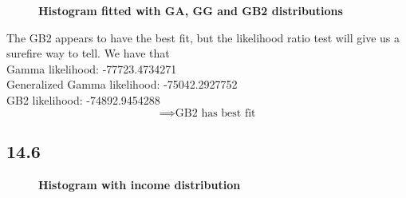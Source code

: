 \documentclass[letterpaper,12pt]{article}
\theoremstyle{definition}
\begin{document}
\begin{figure}[htb]\centering \captionsetup{width=4.0in}
        \caption{\label{Histogram<800}\textbf{Histogram fitted with GA, GG and GB2 distributions}}
\end{figure}

The GB2 appears to have the best fit, but the likelihood ratio test will give us a surefire way to tell. We have that\\
Gamma likelihood:  -77723.4734271\\
Generalized Gamma likelihood:  -75042.2927752\\
GB2 likelihood:  -74892.9454288\\
\[ \implies \text{GB2 has best fit}\]


\subsection*{14.6}



\begin{figure}[htb]\centering \captionsetup{width=4.0in}
        \caption{\label{Histogram<800}\textbf{Histogram with income distribution}}
\end{figure}
\end{document}
